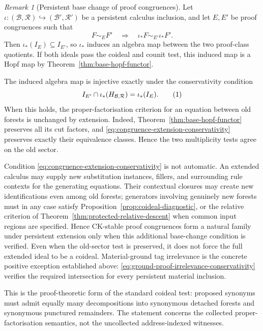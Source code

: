 \documentclass[10pt,a4paper]{article}
\theoremstyle{plain}
\theoremstyle{definition}
\theoremstyle{remark}
\newtheorem{remark}[theorem]{Remark}
\newcommand{\Base}{\mathcal B}
\newcommand{\Rules}{\mathcal R}
\newcommand{\eqtag}{\refstepcounter{equation}\tag{\theequation}}
\begin{document}
\begin{remark}[Persistent base change of proof congruences]
\label{rem:congruence-base-change}
Let
\(\iota:(\Base,\Rules)\hookrightarrow(\Base',\Rules')\)
be a persistent calculus inclusion, and let \(E,E'\) be proof congruences
such that
\[
       F\sim_EF'\quad\Longrightarrow\quad
       \iota_*F\sim_{E'}\iota_*F'.
\]
Then \(\iota_*(I_E)\subseteq I_{E'}\), so \(\iota_*\) induces an algebra
map between the two proof-class quotients.  If both ideals pass the
coideal and counit test, this induced map is a Hopf map by
Theorem~\ref{thm:base-hopf-functor}.

The induced algebra map is injective exactly under the conservativity
condition
\[
 I_{E'}\cap\iota_*(H_{\Base,\Rules})
      =\iota_*(I_E).
\eqtag\label{eq:congruence-extension-conservativity}
\]
When this holds, the proper-factorisation criterion for an equation
between old forests is unchanged by extension.  Indeed,
Theorem~\ref{thm:base-hopf-functor} preserves all its cut factors, and
\eqref{eq:congruence-extension-conservativity} preserves exactly their
equivalence classes.  Hence the two multiplicity tests agree on the old
sector.

Condition \eqref{eq:congruence-extension-conservativity} is not automatic.
An extended
calculus may supply new substitution instances, fillers, and surrounding
rule contexts for the generating equations.  Their contextual closures
may create new identifications even among old forests; generators
involving genuinely new forests must in any case satisfy
Proposition~\ref{prop:coideal-diagnostic}, or the relative criterion of
Theorem~\ref{thm:protected-relative-descent} when common input regions are
specified.  Hence CK-stable proof congruences form a natural family under
persistent extension only when this additional base-change condition is
verified.  Even when the old-sector test is preserved, it does not force
the full extended ideal to be a coideal.  Material-ground tag irrelevance
is the concrete positive exception established above:
\eqref{eq:ground-proof-irrelevance-conservativity} verifies the required
intersection for every persistent material inclusion.
\end{remark}

This is the proof-theoretic form of the standard coideal test: proposed
synonyms must admit equally many decompositions into synonymous detached
forests and synonymous punctured remainders.  The statement concerns the
collected proper-factorisation semantics, not the uncollected address-indexed
witnesses.
\end{document}
